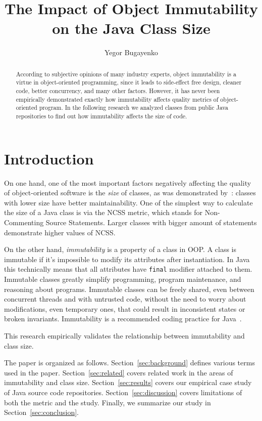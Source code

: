 \documentclass[sigconf]{acmart}
\title{The Impact of Object Immutability on the Java Class Size}
\author{Yegor Bugayenko}{}{}
\affiliation{%
  \institution{Huawei Technologies Co., Ltd.}
  \city{Moscow, Russia}
}
\begin{document}
\begin{abstract}
According to subjective opinions of many industry experts,
object immutability is a virtue in object-oriented programming, since it
leads to side-effect free design, cleaner code, better concurrency,
and many other factors. However, it has never been empirically
demonstrated exactly how immutability affects quality metrics of
object-oriented program. In the following research we analyzed
\thetotaljavafiles{} classes from \thetotalrepos{} public Java repositories
to find out how immutability affects the size of code.
\end{abstract}
\maketitle

\section{Introduction}

On one hand, one of the most important factors negatively affecting the quality
of object-oriented software is the \emph{size} of classes, as was
demonstrated by~\citet{li1993,al2013}: classes with lower size have better maintainability.
One of the simplest way
to calculate the size of a Java class is via the NCSS metric, which
stands for Non-Commenting Source Statements. Larger classes with bigger
amount of statements demonstrate higher values of NCSS.

On the other hand, \emph{immutability} is a property of a class in OOP. A class is immutable if
it's impossible to modify its attributes after instantiation. In Java this
technically means that all attributes have \texttt{final} modifier attached
to them.
Immutable classes greatly simplify programming, program maintenance, and
reasoning about programs. Immutable classes can be freely shared, even between
concurrent threads and with untrusted code, without the need to worry
about modifications, even temporary ones, that could result in
inconsistent states or broken invariants.
Immutability is a recommended coding practice for Java~\citep{bloch2016}.

This research empirically validates the relationship between immutability
and class size.

The paper is organized as follows.
Section~\ref{sec:background} defines various terms used in the paper.
Section~\ref{sec:related} covers related work in the areas of immutability and class size.
Section~\ref{sec:results} covers our empirical case study of \thetotalrepos{} Java source code repositories.
Section~\ref{sec:discussion} covers limitations of both the metric and the study.
Finally, we summarize our study in Section~\ref{sec:conclusion}.
\end{document}

